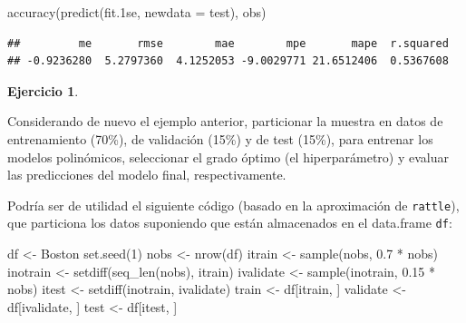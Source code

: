 \documentclass[
]{book}
\newenvironment{Shaded}{\begin{snugshade}}{\end{snugshade}}
\newcommand{\AttributeTok}[1]{\textcolor[rgb]{0.77,0.63,0.00}{#1}}
\newcommand{\DecValTok}[1]{\textcolor[rgb]{0.00,0.00,0.81}{#1}}
\newcommand{\FloatTok}[1]{\textcolor[rgb]{0.00,0.00,0.81}{#1}}
\newcommand{\FunctionTok}[1]{\textcolor[rgb]{0.00,0.00,0.00}{#1}}
\newcommand{\NormalTok}[1]{#1}
\newcommand{\OtherTok}[1]{\textcolor[rgb]{0.56,0.35,0.01}{#1}}
\newcommand{\SpecialCharTok}[1]{\textcolor[rgb]{0.00,0.00,0.00}{#1}}
\theoremstyle{break}
\theoremstyle{definition}
\theoremstyle{definition}
\theoremstyle{definition}
\newtheorem{exercise}{Ejercicio}[chapter]
\theoremstyle{definition}
\theoremstyle{remark}
\begin{document}
\begin{Shaded}
\begin{Highlighting}[]
\FunctionTok{accuracy}\NormalTok{(}\FunctionTok{predict}\NormalTok{(fit}\FloatTok{.1}\NormalTok{se, }\AttributeTok{newdata =}\NormalTok{ test), obs)}
\end{Highlighting}
\end{Shaded}

\begin{verbatim}
##         me       rmse        mae        mpe       mape  r.squared 
## -0.9236280  5.2797360  4.1252053 -9.0029771 21.6512406  0.5367608
\end{verbatim}

\begin{exercise}
\protect\hypertarget{exr:train-validate-test}{}{\label{exr:train-validate-test} }
\end{exercise}

Considerando de nuevo el ejemplo anterior, particionar la muestra en datos de entrenamiento (70\%), de validación (15\%) y de test (15\%), para entrenar los modelos polinómicos, seleccionar el grado óptimo (el hiperparámetro) y evaluar las predicciones del modelo final, respectivamente.

Podría ser de utilidad el siguiente código (basado en la aproximación de \texttt{rattle}), que particiona los datos suponiendo que están almacenados en el data.frame \texttt{df}:

\begin{Shaded}
\begin{Highlighting}[]
\NormalTok{df }\OtherTok{\textless{}{-}}\NormalTok{ Boston}
\FunctionTok{set.seed}\NormalTok{(}\DecValTok{1}\NormalTok{)}
\NormalTok{nobs }\OtherTok{\textless{}{-}} \FunctionTok{nrow}\NormalTok{(df)}
\NormalTok{itrain }\OtherTok{\textless{}{-}} \FunctionTok{sample}\NormalTok{(nobs, }\FloatTok{0.7} \SpecialCharTok{*}\NormalTok{ nobs)}
\NormalTok{inotrain }\OtherTok{\textless{}{-}} \FunctionTok{setdiff}\NormalTok{(}\FunctionTok{seq\_len}\NormalTok{(nobs), itrain)}
\NormalTok{ivalidate }\OtherTok{\textless{}{-}} \FunctionTok{sample}\NormalTok{(inotrain, }\FloatTok{0.15} \SpecialCharTok{*}\NormalTok{ nobs)}
\NormalTok{itest }\OtherTok{\textless{}{-}} \FunctionTok{setdiff}\NormalTok{(inotrain, ivalidate)}
\NormalTok{train }\OtherTok{\textless{}{-}}\NormalTok{ df[itrain, ]}
\NormalTok{validate }\OtherTok{\textless{}{-}}\NormalTok{ df[ivalidate, ]}
\NormalTok{test }\OtherTok{\textless{}{-}}\NormalTok{ df[itest, ]}
\end{Highlighting}
\end{Shaded}
\end{document}
